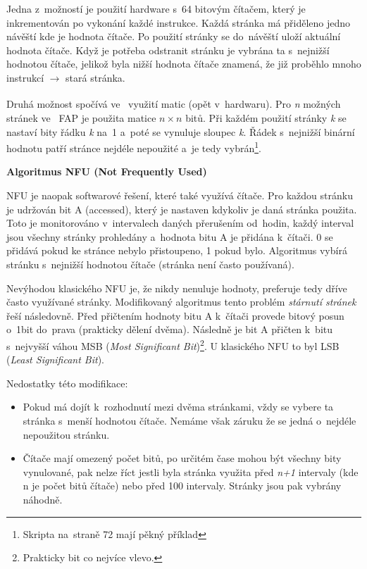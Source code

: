 \vspace{0,5cm}

Jedna z~možností je použití hardware s~64 bitovým čítačem, který je inkrementován po vykonání každé instrukce. Každá stránka má přiděleno jedno návěští kde je hodnota čítače. Po použití stránky se do~návěští uloží aktuální hodnota čítače. Když je potřeba odstranit stránku je vybrána ta s~nejnižší hodnotou čítače, jelikož byla nižší hodnota čítače znamená, že již proběhlo mnoho instrukcí $\xrightarrow[]{}$ stará stránka. 

\clearpage

Druhá možnost spočívá ve~ využití matic (opět v~hardwaru). Pro \emph{n} možných stránek ve~ FAP je použita matice $n \times n$ bitů. Při každém použití stránky \emph{k} se nastaví bity řádku \emph{k} na~1 a~poté se vynuluje sloupec \emph{k}. Řádek s~nejnižší binární hodnotu patří stránce nejdéle nepoužité a~je tedy vybrán\footnote{Skripta na~straně 72 mají pěkný příklad}. 

\begin{Large}
    \vspace{0,5cm}
    \textbf{Algoritmus NFU (Not Frequently Used)}
\end{Large}

NFU je naopak softwarové řešení, které také využívá čítače. Pro každou stránku je udržován bit A (accessed), který je nastaven kdykoliv je daná stránka použita. Toto je monitorováno v~intervalech daných přerušením od~hodin, každý interval jsou všechny stránky prohledány a~hodnota bitu A je přidána k~čítači.  0 se přidává pokud ke stránce nebylo přistoupeno, 1 pokud bylo. Algoritmus vybírá stránku s~nejnižší hodnotou čítače (stránka není často používaná). 

\vspace{0,5cm}

Nevýhodou klasického NFU je, že nikdy nenuluje hodnoty, preferuje tedy dříve často využívané stránky. Modifikovaný algoritmus tento problém \emph{stárnutí stránek} řeší následovně. Před přičtením hodnoty bitu A k~čítači provede bitový posun o~1bit do~prava (prakticky dělení dvěma). Následně je bit A přičten k~bitu s~nejvyšší váhou MSB (\emph{Most Significant Bit})\footnote{Prakticky bit co nejvíce vlevo.}. U klasického NFU to byl LSB (\emph{Least Significant Bit}). 

\vspace{0,5cm}

Nedostatky této modifikace:

\begin{itemize}
    \item Pokud má dojít k~rozhodnutí mezi dvěma stránkami, vždy se vybere ta stránka s~menší hodnotou čítače. Nemáme však záruku že se jedná o~nejdéle nepoužitou stránku. 
    \item Čítače mají omezený počet bitů, po určitém čase mohou být všechny bity vynulované, pak nelze říct jestli byla stránka využita před \emph{n+1} intervaly (kde n je počet bitů čítače) nebo před 100 intervaly. Stránky jsou pak vybrány náhodně. 
\end{itemize} 

